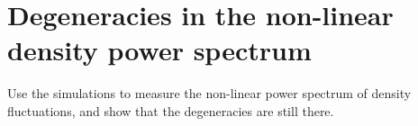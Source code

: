 \section{Degeneracies in the non-linear density power spectrum}
\label{sec:dens}

Use the simulations to measure the non-linear power spectrum of density
fluctuations, and show that the degeneracies are still there.
